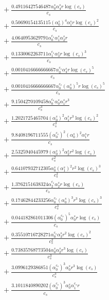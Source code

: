 \documentclass[10pt]{article}
\begin{document}
\begin{align*}
&{}  + \frac{0.49116427546487 \alpha_{0}^s \alpha_{4}^s r \log{\left(c_{s} \right)}}{c_{s}} \\
&{}  + \frac{0.50690154135115 \left(\alpha_{0}^s\right)^{4} \alpha_{1}^s r \log{\left(c_{s} \right)}^{2}}{c_{s}} \\
&{}  + \frac{4.0640953629791 \alpha_{0}^{c_s} \alpha_{1}^s \alpha_{2}^s r}{c_{s}} \\
&{}  + \frac{0.1330062263711 \alpha_{1}^{c_s} \alpha_{3}^s r \log{\left(c_{s} \right)}^{3}}{c_{s}} \\
&{}  + \frac{0.0010416666666667 \alpha_{0}^{c_s} \alpha_{4}^s r \log{\left(c_{s} \right)}^{5}}{c_{s}} \\
&{}  + \frac{0.0010416666666667 \alpha_{0}^{c_s} \left(\alpha_{0}^s\right)^{5} r \log{\left(c_{s} \right)}^{5}}{c_{s}} \\
&{}  + \frac{9.1504270109458 \alpha_{0}^{c_s} \alpha_{0}^s \alpha_{1}^s r^{3}}{c_{s}^{3}} \\
&{}  + \frac{1.2021725465704 \left(\alpha_{0}^s\right)^{2} \alpha_{1}^s r^{3} \log{\left(c_{s} \right)}^{2}}{c_{s}^{3}} \\
&{}  + \frac{9.8408196711555 \left(\alpha_{0}^{c_s}\right)^{2} \left(\alpha_{0}^s\right)^{2} \alpha_{1}^s r}{c_{s}} \\
&{}  + \frac{2.5325940445979 \left(\alpha_{0}^s\right)^{2} \alpha_{2}^s r^{2} \log{\left(c_{s} \right)}}{c_{s}^{2}} \\
&{}  + \frac{0.64107932712305 \alpha_{0}^s \left(\alpha_{1}^s\right)^{2} r^{2} \log{\left(c_{s} \right)}^{3}}{c_{s}^{2}} \\
&{}  + \frac{1.3762151638324 \alpha_{2}^{c_s} \alpha_{2}^s r \log{\left(c_{s} \right)}}{c_{s}} \\
&{}  + \frac{0.17462844233256 \alpha_{0}^{c_s} \left(\alpha_{0}^s\right)^{3} r^{3} \log{\left(c_{s} \right)}^{3}}{c_{s}^{3}} \\
&{}  + \frac{0.044182861011306 \left(\alpha_{0}^{c_s}\right)^{5} \alpha_{0}^s r \log{\left(c_{s} \right)}}{c_{s}} \\
&{}  + \frac{0.35510716728271 \alpha_{0}^{c_s} \alpha_{3}^s r^{2} \log{\left(c_{s} \right)}^{2}}{c_{s}^{2}} \\
&{}  + \frac{0.73835768773504 \alpha_{0}^s \alpha_{2}^s r^{3} \log{\left(c_{s} \right)}}{c_{s}^{3}} \\
&{}  + \frac{3.0996129386851 \left(\alpha_{0}^{c_s}\right)^{3} \alpha_{0}^s r^{3} \log{\left(c_{s} \right)}}{c_{s}^{3}} \\
&{}  + \frac{3.1011840890202 \left(\alpha_{0}^{c_s}\right)^{3} \alpha_{0}^s \alpha_{1}^{c_s} r}{c_{s}} \\

\end{align*}
\end{document}

